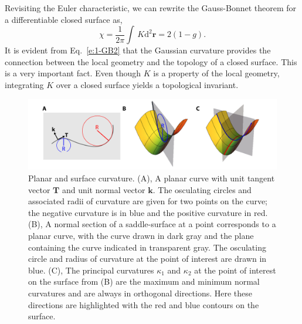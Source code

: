 Revisiting the Euler characteristic, we can rewrite the Gauss-Bonnet theorem for a differentiable closed surface as,
\begin{equation}
  \chi = \frac{1}{2 \pi} \int \, K \textrm{d}^2\mathbf{r} = 2(1-g)\label{e:1-GB2}.
\end{equation}
It is evident from Eq.~\ref{e:1-GB2} that the Gaussian curvature provides the connection between the local geometry and the topology of a closed surface.
This is a very important fact.
Even though $K$ is a property of the local geometry, integrating $K$ over a closed surface yields a topological invariant.
\begin{figure}
  \centering
  \includegraphics{figures/C1/Ch1-Figs_Curvature.png}
  \caption{Planar and surface curvature.
  (A), A planar curve with unit tangent vector $\mathbf{T}$ and unit normal vector $\mathbf{k}$. The osculating circles and associated radii of curvature are given for two points on the curve; the negative curvature is in blue and the positive curvature in red.
  (B), A normal section of a saddle-surface at a point corresponds to a planar curve, with the curve drawn in dark gray and the plane containing the curve indicated in transparent gray.
  The osculating circle and radius of curvature at the point of interest are drawn in blue.
  (C), The principal curvatures $\kappa_1$ and $\kappa_2$ at the point of interest on the surface from (B) are the maximum and minimum normal curvatures and are always in orthogonal directions. Here these directions are highlighted with the red and blue contours on the surface.}\label{f:1-Curvature}
\end{figure}

